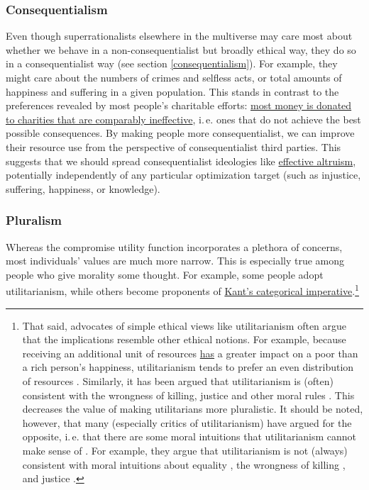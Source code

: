 \subsubsection{Consequentialism}\label{consequentialism-1}

Even though superrationalists elsewhere in the multiverse may care most
about whether we behave in a non-consequentialist but broadly ethical
way, they do so in a consequentialist way (see section
\ref{consequentialism}). For
example, they might care about the numbers of crimes and selfless acts,
or total amounts of happiness and suffering in a given population. This
stands in contrast to the preferences revealed by most people's
charitable efforts: \href{http://www.givewell.org/giving101}{most
money is donated to charities that are comparably ineffective}, i.\,e.
ones that do not achieve the best possible consequences. By making
people more consequentialist, we can improve their resource use from the
perspective of consequentialist third parties. This suggests that we
should spread consequentialist ideologies like
\href{https://en.wikipedia.org/wiki/Effective_altruism}{effective
altruism}, potentially independently of any particular optimization
target (such as injustice, suffering, happiness, or knowledge).

\hypertarget{pluralism}{\subsubsection{Pluralism}\label{pluralism}}

Whereas the compromise utility function incorporates a plethora of
concerns, most individuals' values are much more narrow. This is
especially true among people who give morality some thought. For
example, some people adopt utilitarianism, while others become
proponents of
\href{https://en.wikipedia.org/wiki/Categorical_imperative}{Kant's
categorical imperative}.\footnote{That said, advocates of simple
  ethical views like utilitarianism often argue that the implications
  resemble other ethical notions. For example, because receiving an
  additional unit of resources
  \href{https://80000hours.org/articles/money-and-happiness/}{has}
  a greater impact on a poor than a rich person's happiness,
  utilitarianism tends to prefer an even distribution of resources
  \parencite{noauthor_2012-yb}. Similarly, it has been
  argued that utilitarianism is (often) consistent with the wrongness of
  killing, justice \parencite{Mill1863-bm} and other moral
  rules \parencite{Smart1973-eo}. This decreases the value
  of making utilitarians more pluralistic. It should be noted, however,
  that many (especially critics of utilitarianism) have argued for the
  opposite, i.\,e. that there are some moral intuitions that
  utilitarianism cannot make sense of
  \parencite{noauthor_undated-mj}. For example, they argue
  that utilitarianism is not (always) consistent with moral intuitions
  about equality \parencite{Pogge1995-mo,Gosepath2011-vx},
  the wrongness of killing \parencite{Henson1971-le}, and
  justice \parencite{Smart1973-eo}.}

